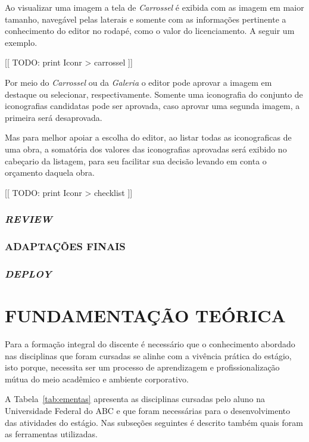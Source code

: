 \documentclass[
  12pt,				%
  openany,
  oneside,
  a4paper,			%
  english,			%
  brazil
]{article}
\numberwithin{figure}{section}
\numberwithin{table}{section}
\begin{document}
Ao visualizar uma imagem a tela de \textit{Carrossel} é exibida com as imagem em maior tamanho, navegável pelas laterais e somente com as informações pertinente a conhecimento do editor no rodapé, como o valor do licenciamento. A seguir um exemplo.

[[ TODO: print Iconr > carrossel ]] 

Por meio do \textit{Carrossel} ou da \textit{Galeria} o editor pode aprovar a imagem em destaque ou selecionar, respectivamente. Somente uma iconografia do conjunto de iconografias candidatas pode ser aprovada, caso aprovar uma segunda imagem, a primeira será desaprovada.

Mas para melhor apoiar a escolha do editor, ao listar todas as iconograficas de uma obra, a somatória dos valores das iconografias aprovadas será exibido no cabeçario da listagem, para seu facilitar sua decisão levando em conta o orçamento daquela obra.
 
[[ TODO: print Iconr > checklist ]] 


\subsubsection{\textit{REVIEW}}


\subsubsection{ADAPTAÇÕES FINAIS}

\subsubsection{\textit{DEPLOY}}



\clearpage
\section{FUNDAMENTAÇÃO TEÓRICA}


Para a formação integral do discente é necessário que o conhecimento abordado nas disciplinas que foram cursadas se alinhe com a vivência prática do estágio, isto porque, necessita ser um processo de aprendizagem e profissionalização mútua do meio acadêmico e ambiente corporativo.

A Tabela~\ref{tab:ementas} apresenta as disciplinas cursadas pelo aluno na Universidade Federal do ABC e que foram necessárias para o desenvolvimento das atividades do estágio. Nas subseções seguintes é descrito também quais foram as ferramentas utilizadas.
\end{document}
